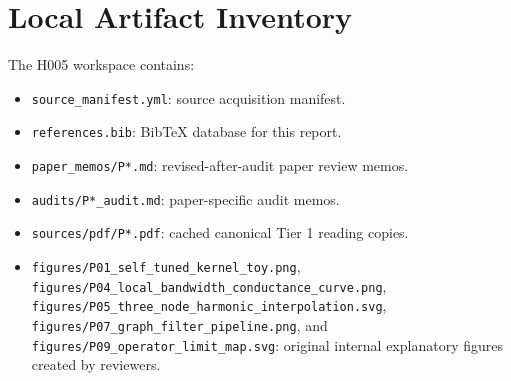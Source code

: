 \documentclass[11pt]{article}
\newcommand{\code}[1]{\texttt{#1}}
\begin{document}
\appendix
\section{Local Artifact Inventory}

The H005 workspace contains:
\begin{itemize}
  \item \code{source\_manifest.yml}: source acquisition manifest.
  \item \code{references.bib}: BibTeX database for this report.
  \item \code{paper\_memos/P*.md}: revised-after-audit paper review memos.
  \item \code{audits/P*\_audit.md}: paper-specific audit memos.
  \item \code{sources/pdf/P*.pdf}: cached canonical Tier 1 reading copies.
  \item \code{figures/P01\_self\_tuned\_kernel\_toy.png},
    \code{figures/P04\_local\_bandwidth\_conductance\_curve.png},
    \code{figures/P05\_three\_node\_harmonic\_interpolation.svg},
    \code{figures/P07\_graph\_filter\_pipeline.png}, and
    \code{figures/P09\_operator\_limit\_map.svg}: original internal
    explanatory figures created by reviewers.
\end{itemize}



\end{document}
